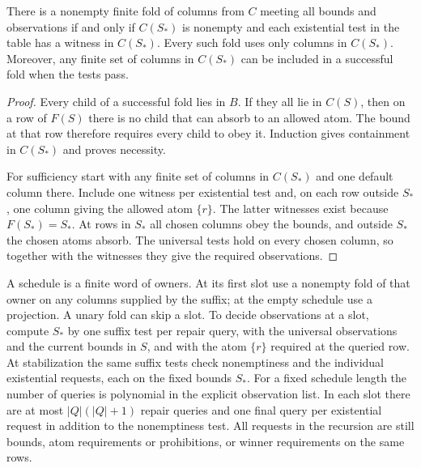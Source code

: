 \begin{theorem}\label{core:thm:owner-fold-closure}
There is a nonempty finite fold of columns from $C$ meeting all bounds
and observations if and only if $C(S_*)$ is nonempty and each
existential test in the table has a witness in $C(S_*)$. Every such
fold uses only columns in $C(S_*)$. Moreover, any finite set of columns
in $C(S_*)$ can be included in a successful fold when the tests pass.
\end{theorem}
\begin{proof}
Every child of a successful fold lies in $B$. If they all lie in
$C(S)$, then on a row of $F(S)$ there is no child that can absorb to an
allowed atom. The bound at that row therefore requires every child to
obey it. Induction gives containment in $C(S_*)$ and proves necessity.

For sufficiency start with any finite set of columns in $C(S_*)$ and
one default column there. Include one witness per existential test and,
on each row outside $S_*$, one column giving the allowed atom $\{r\}$.
The latter witnesses exist because $F(S_*)=S_*$. At rows in $S_*$
all chosen columns obey the bounds, and outside $S_*$ the chosen atoms
absorb. The universal tests hold on every chosen column, so together
with the witnesses they give the required observations.
\end{proof}

A schedule is a finite word of owners. At its first slot use a
nonempty fold of that owner on any columns supplied by the suffix;
at the empty schedule use a projection. A unary fold can skip a slot.
To decide observations at a slot, compute $S_*$ by one suffix test
per repair query, with the universal observations and the current
bounds in $S$, and with the atom $\{r\}$ required at the queried row.
At stabilization the same suffix tests check nonemptiness and the
individual existential requests, each on the fixed bounds $S_*$.
For a fixed schedule length the number of queries is polynomial in
the explicit observation list. In each slot there are at most
$|Q|(|Q|+1)$ repair queries and one final query per existential request
in addition to the nonemptiness test. All requests in the recursion
are still bounds, atom requirements or prohibitions, or winner
requirements on the same rows.


